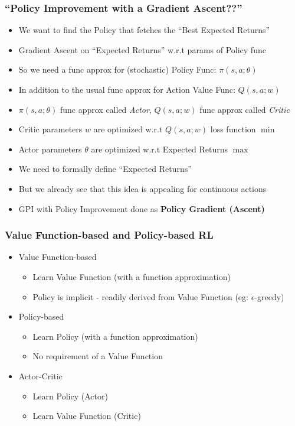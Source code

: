 \documentclass[handout]{beamer}
\begin{document}
\begin{frame}
\frametitle{``Policy Improvement with a Gradient Ascent??''}
\pause
\begin{itemize}[<+->]
\item We want to find the Policy that fetches the ``Best Expected Returns''
\item Gradient Ascent on ``Expected Returns'' w.r.t params of Policy func
\item So we need a func approx for (stochastic) Policy Func: $\pi(s, a; \theta)$
\item In addition to the usual func approx for Action Value Func: $Q(s, a; w)$
\item $\pi(s, a; \theta)$ func approx called {\em Actor}, $Q(s, a; w)$ func approx called {\em Critic}
\item Critic parameters $w$ are optimized w.r.t $Q(s, a; w)$ loss function $\min$
\item Actor parameters $\theta$ are optimized w.r.t Expected Returns $\max$
\item We need to formally define ``Expected Returns''
\item But we already see that this idea is appealing for continuous actions
\item GPI with Policy Improvement done as {\bf Policy Gradient (Ascent)}
\end{itemize}
\end{frame}

\begin{frame}
\frametitle{Value Function-based and Policy-based RL}
\pause
\begin{itemize}[<+->]
\item Value Function-based
\begin{itemize}
\item Learn Value Function (with a function approximation)
\item Policy is implicit - readily derived from Value Function (eg: $\epsilon$-greedy)
\end{itemize}
\item Policy-based
\begin{itemize}
\item Learn Policy (with a function approximation)
\item No requirement of a Value Function
\end{itemize}
\item Actor-Critic
\begin{itemize}
\item Learn Policy (Actor)
\item Learn Value Function (Critic)
\end{itemize}
\end{itemize}
\end{frame}
\end{document}
